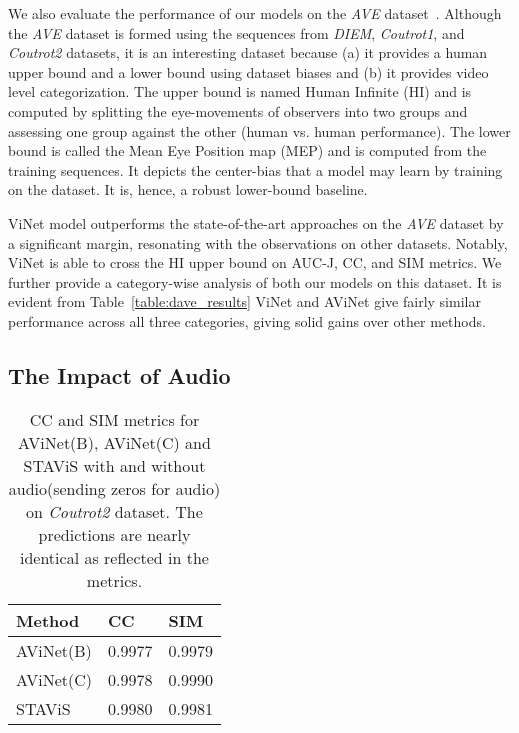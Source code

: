 \documentclass[letterpaper, 10 pt, conference]{ieeeconf}  \usepackage{times}
\begin{document}
We also evaluate the performance of our models on the \emph{AVE} dataset~\cite{tavakoli2019dave}. Although the \emph{AVE} dataset is formed using the sequences from \emph{DIEM}, \emph{Coutrot1}, and \emph{Coutrot2} datasets, it is an interesting dataset because (a) it provides a human upper bound and a lower bound using dataset biases and (b) it provides video level categorization. The upper bound is named Human Infinite (HI) and is computed by splitting the eye-movements of observers into two groups and assessing one group against the other (human vs. human performance). The lower bound is called the Mean Eye Position map (MEP) and is computed from the training sequences. It depicts the center-bias that a model may learn by training on the dataset. It is, hence, a robust lower-bound baseline.

ViNet model outperforms the state-of-the-art approaches on the \emph{AVE} dataset by a significant margin, resonating with the observations on other datasets. Notably, ViNet is able to cross the HI upper bound on AUC-J, CC, and SIM metrics. We further provide a category-wise analysis of both our models on this dataset. It is evident from Table~\ref{table:dave_results} ViNet and AViNet give fairly similar performance across all three categories, giving solid gains over other methods.  

\subsection{The Impact of Audio}
\begin{table}[]
\caption{CC and SIM metrics for AViNet(B), AViNet(C) and STAViS with and without audio(sending zeros for audio) on \emph{Coutrot2} dataset. The predictions are nearly identical as reflected in the metrics.  }
\begin{center}
\begin{tabular}{@{}lll@{}}
\toprule
Method    & CC & SIM \\ \midrule
AViNet(B) &  0.9977  & 0.9979    \\
AViNet(C) & 0.9978   & 0.9990    \\
STAViS &  0.9980  & 0.9981      \\ \bottomrule
\end{tabular}
\end{center}
\label{table:with_without_audio}
\vspace{-1.5em}
\end{table}
\end{document}
